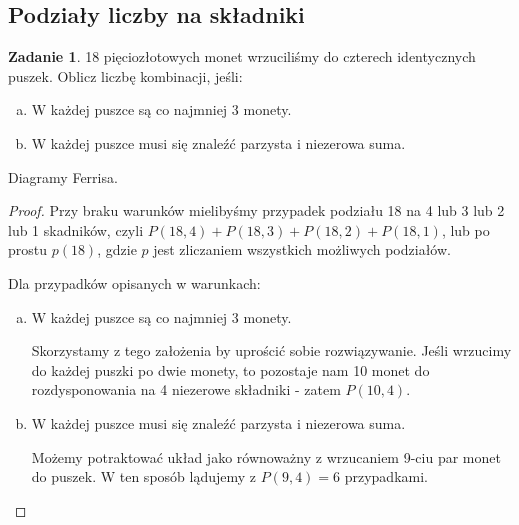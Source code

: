 \documentclass[11pt]{article}
\theoremstyle{definition}
\newtheorem{zadanie}{Zadanie}
\numberwithin{zadanie}{subsection}
\begin{document}
\subsection{Podziały liczby na składniki}

\begin{zadanie}
    18 pięciozłotowych monet wrzuciliśmy do czterech identycznych puszek. Oblicz liczbę kombinacji, jeśli:
    \begin{enumerate}[a)]
        \item W każdej puszce są co najmniej 3 monety.
        \item W każdej puszce musi się znaleźć parzysta i niezerowa suma.
    \end{enumerate}
    Diagramy Ferrisa.
\end{zadanie}
\begin{proof}
    Przy braku warunków mielibyśmy przypadek podziału 18 na 4 lub 3 lub 2 lub 1 skadników, czyli $P(18,4)+P(18,3)+P(18,2)+P(18,1)$, lub po prostu $p(18)$, gdzie $p$ jest zliczaniem wszystkich możliwych podziałów.

    Dla przypadków opisanych w warunkach:

    \begin{enumerate}[a)]
        \item W każdej puszce są co najmniej 3 monety.

              Skorzystamy z tego założenia by uprościć sobie rozwiązywanie. Jeśli wrzucimy do każdej puszki po dwie monety, to pozostaje nam 10 monet do rozdysponowania na 4 niezerowe składniki - zatem $P(10,4)$.

        \item W każdej puszce musi się znaleźć parzysta i niezerowa suma.

              Możemy potraktować układ jako równoważny z wrzucaniem 9-ciu par monet do puszek. W ten sposób lądujemy z $P(9,4)=6$ przypadkami.
    \end{enumerate}

\end{proof}
\end{document}
